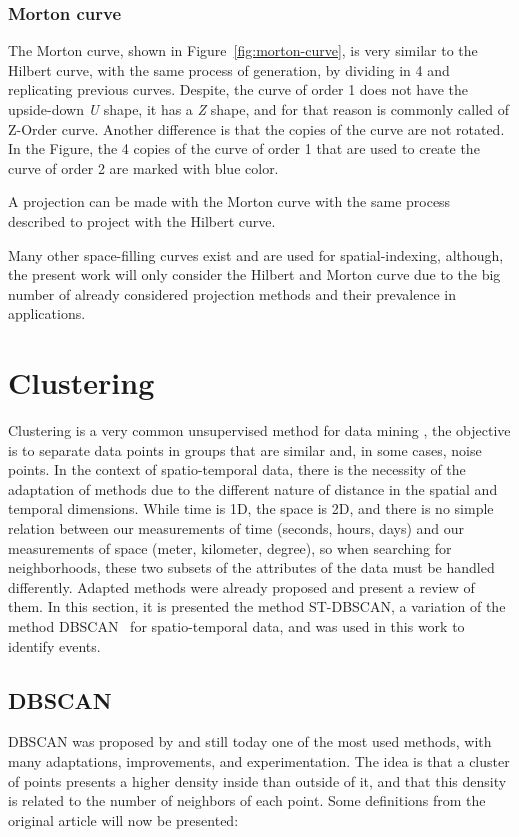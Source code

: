 \subsubsection{Morton curve} 

The Morton curve, shown in Figure~\ref{fig:morton-curve}, is very similar to the Hilbert curve, with the same process of generation, by dividing in 4 and replicating previous curves.
%
Despite, the curve of order 1 does not have the upside-down \textit{U} shape, it has a \textit{Z} shape, and for that reason is commonly called of Z-Order curve.
%
Another difference is that the copies of the curve are not rotated.
%
In the Figure, the 4 copies of the curve of order 1 that are used to create the curve of order 2 are marked with blue color.

A projection can be made with the Morton curve with the same process described to project with the Hilbert curve.
%

Many other space-filling curves exist and are used for spatial-indexing, although,
%
the present work will only consider the Hilbert and Morton curve due to the big number of already considered projection methods 
%
and their prevalence in applications.

\section{Clustering}
\label{sec:clustering}

Clustering is a very common unsupervised method for data mining \cite{ansari2020spatiotemporal}, the objective is to separate data points in groups that are similar and, in some cases, noise points.
%
In the context of spatio-temporal data, there is the necessity of the adaptation of methods due to the different nature of distance in the spatial and temporal dimensions. 
%
While time is 1D, the space is 2D, and there is no simple relation between our measurements of time (seconds, hours, days) and our measurements of space (meter, kilometer, degree), so when searching for neighborhoods, these two subsets of the attributes of the data must be handled differently.
%
Adapted methods were already proposed and \cite{ansari2020spatiotemporal} present a review of them.
%
In this section, it is presented the method ST-DBSCAN, a variation of the method DBSCAN~\cite{ester1996density} for spatio-temporal data, and was used in this work to identify events.
%

\subsection{DBSCAN}
DBSCAN was proposed by \cite{ester1996density} and still today one of the most used methods, with many adaptations, improvements, and experimentation.
%
The idea is that a cluster of points presents a higher density inside than outside of it, and that this density is related to the number of neighbors of each point. Some definitions from the original article will now be presented:
%

